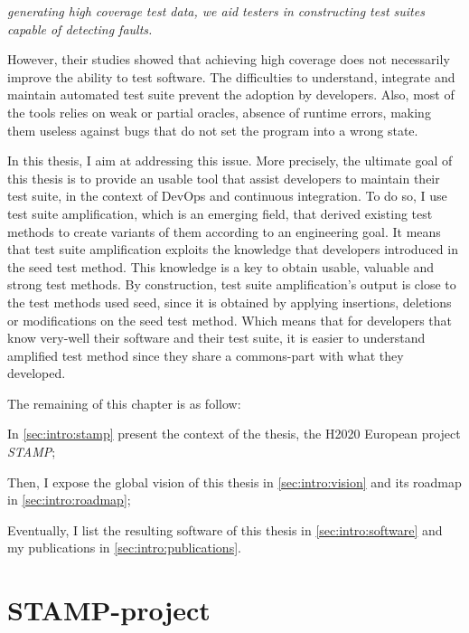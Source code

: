 \emph{generating high coverage test data, we aid testers in constructing test suites capable of detecting faults.}

However, their studies showed that achieving high coverage does not necessarily improve the ability to test software.
The difficulties to understand, integrate and maintain automated test suite prevent the adoption by developers.
Also, most of the tools relies on weak or partial oracles, \eg absence of runtime errors, making them useless against bugs that do not set the program into a wrong state.

In this thesis, I aim at addressing this issue.
More precisely, the ultimate goal of this thesis is to provide an usable tool that assist developers to maintain their test suite, in the context of DevOps and continuous integration.
To do so, I use test suite amplification, which is an emerging field, that derived existing test methods to create variants of them according to an engineering goal.
It means that test suite amplification exploits the knowledge that developers introduced in the seed test method.
This knowledge is a key to obtain usable, valuable and strong test methods.
By construction, test suite amplification's output is close to the test methods used seed, since it is obtained by applying insertions, deletions or modifications on the seed test method.
Which means that for developers that know very-well their software and their test suite, it is easier to understand amplified test method since they share a commons-part with what they developed.

The remaining of this chapter is as follow:

In \autoref{sec:intro:stamp} present the context of the thesis, the H2020 European project \emph{STAMP};

Then, I expose the global vision  of this thesis in \autoref{sec:intro:vision} and its roadmap in \autoref{sec:intro:roadmap};

Eventually, I list the resulting software of this thesis in \autoref{sec:intro:software} and my publications in \autoref{sec:intro:publications}.

\section{STAMP-project}
\label{sec:intro:stamp}

